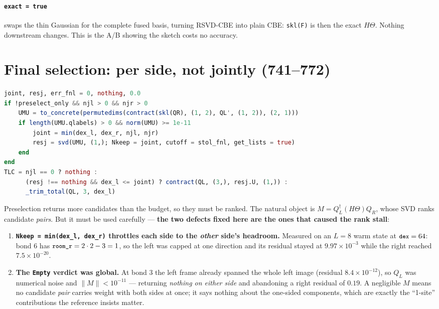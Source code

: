 \documentclass[11pt,a4paper]{article}
\newcommand{\code}[1]{\texttt{\small #1}}
\begin{document}
\paragraph{\code{exact = true}} swaps the thin Gaussian for the complete fused basis, turning
RSVD-CBE into plain CBE: \code{skl(F)} is then the exact $H\Theta$. Nothing downstream changes.
This is the A/B showing the sketch costs no accuracy.

\section{Final selection: per side, not jointly (741--772)}
\label{sec:final}

\begin{lstlisting}[language=Julia,firstnumber=744]
joint, resj, err_fnl = 0, nothing, 0.0
if !preselect_only && njl > 0 && njr > 0
    UMU = to_concrete(permutedims(contract(skl(QR), (1, 2), QL', (1, 2)), (2, 1)))
    if length(UMU.qlabels) > 0 && norm(UMU) >= 1e-11
        joint = min(dex_l, dex_r, njl, njr)
        resj = svd(UMU, (1,); Nkeep = joint, cutoff = stol_fnl, get_lists = true)
    end
end
TLC = njl == 0 ? nothing :
      (resj !== nothing && dex_l <= joint) ? contract(QL, (3,), resj.U, (1,)) :
      _trim_total(QL, 3, dex_l)
\end{lstlisting}

Preselection returns more candidates than the budget, so they must be ranked. The natural
object is $M = Q_L^\dagger(H\Theta)Q_R$, whose SVD ranks candidate \emph{pairs}. But it must be
used carefully --- \textbf{the two defects fixed here are the ones that caused the rank stall}:

\begin{enumerate}[leftmargin=1.6em]
  \item \textbf{\code{Nkeep = min(dex\_l, dex\_r)} throttles each side to the \emph{other}
        side's headroom.} Measured on an $L=8$ warm state at $\code{dex}=64$: bond 6 has
        $\code{room\_r}=2\cdot2-3=1$, so the left was capped at one direction and its residual
        stayed at $9.97\times10^{-3}$ while the right reached $7.5\times10^{-20}$.
  \item \textbf{The \code{Empty} verdict was global.} At bond 3 the left frame already spanned
        the whole left image (residual $8.4\times10^{-12}$), so $Q_L$ was numerical noise and
        $\|M\|<10^{-11}$ --- returning \emph{nothing on either side} and abandoning a right
        residual of $0.19$. A negligible $M$ means no candidate \emph{pair} carries weight with
        both sides at once; it says nothing about the one-sided components, which are exactly
        the ``1-site'' contributions the reference insists matter.
\end{enumerate}
\end{document}
